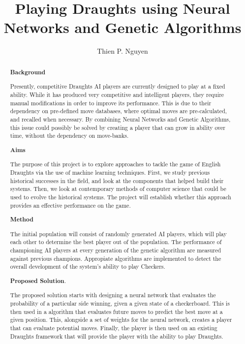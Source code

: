 \documentclass[12pt,a4paper]{article}
\title{Playing Draughts using Neural Networks and Genetic Algorithms}
\author{Thien P. Nguyen}
\begin{document}
\maketitle

\begin{abstract}

    {\bf Background}

    Presently, competitive Draughts AI players are currently designed to play at a fixed ability. While it has produced very competitive and intelligent players, they require manual modifications in order to improve its performance. This is due to their dependency on pre-defined move databases, where optimal moves are pre-calculated, and recalled when necessary. By combining Neural Networks and Genetic Algorithms, this issue could possibly be solved by creating a player that can grow in ability over time, without the dependency on move-banks.
    
    {\bf Aims}

    The purpose of this project is to explore approaches to tackle the game of English Draughts via the use of  machine learning techniques. First, we study previous historical successes in the field, and look at the components that helped build their systems. Then, we look at contemporary methods of computer science that could be used to evolve the historical systems. The project will establish whether this approach provides an effective performance on the game.
    
    {\bf Method}

    The initial population will consist of randomly generated AI players, which will play each other to determine the best player out of the population. The performance of championing AI players at every generation of the genetic algorithm are measured against previous champions. Appropiate algorithms are implemented to detect the overall development of the system's ability to play Checkers.

    {\bf Proposed Solution}.  

    The proposed solution starts with designing a neural network that evaluates the probability of a particular side winning, given a given state of a checkerboard. This is then used in a algorithm that evaluates future moves to predict the best move at a given position. This, alongside a set of weights for the neural network, creates a player that can evaluate potential moves. Finally, the player is then used on an existing Draughts framework that will provide the player with the ability to play Draughts.

\end{abstract}
\end{document}

